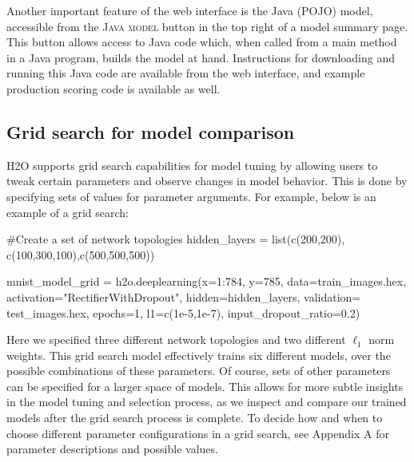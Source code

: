 \documentclass[12pt]{article}
\begin{document}
Another important feature of the web interface is the Java (POJO) model, accessible from the \textsc{Java model} button in the top right of a model summary page. This button allows access to Java code which, when called from a main method in a Java program, builds the model at hand. Instructions for downloading and running this Java code are available from the web interface, and example production scoring  code is available as well.

\subsection{Grid search for model comparison}

H2O supports grid search capabilities for model tuning by allowing users to tweak certain parameters and observe changes in model behavior. This is done by specifying sets of values for parameter arguments. For example, below is an example of a grid search:

\begin{spverbatim}
#Create a set of network topologies
hidden_layers = list(c(200,200), c(100,300,100),c(500,500,500))

mnist_model_grid = h2o.deeplearning(x=1:784, y=785, data=train_images.hex, activation="RectifierWithDropout", hidden=hidden_layers, validation=
test_images.hex, epochs=1, l1=c(1e-5,1e-7), input_dropout_ratio=0.2)

\end{spverbatim}
\noindent
Here we specified three different network topologies and two different $\ell_1$ norm weights. This grid search model effectively trains six different models, over the possible combinations of these parameters. Of course, sets of other parameters can be specified for a larger space of models. This allows for more subtle insights in the model tuning and selection process, as we inspect and compare our trained models after the grid search process is complete. To decide how and when to choose different parameter configurations in a grid search, see Appendix A for parameter descriptions and possible values.

\end{document}
